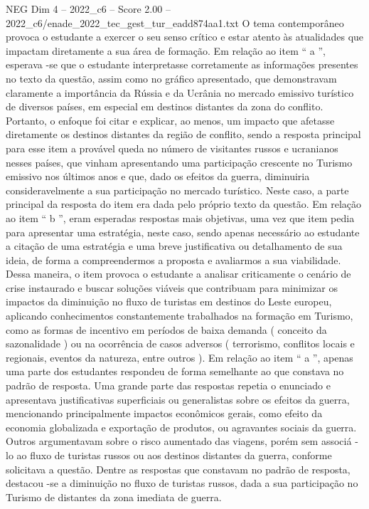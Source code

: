 \begin{textsample}{NEG Dim 4 – 2022\_c6 – Score 2.00 – 2022\_c6/enade\_2022\_tec\_gest\_tur\_eadd874aa1.txt}
O tema contemporâneo provoca o estudante a exercer o seu senso crítico e estar atento às atualidades que impactam diretamente a sua área de formação.
Em relação ao item “ a ”, esperava -se que o estudante interpretasse corretamente as informações presentes no texto da questão, assim como no gráfico apresentado, que demonstravam claramente a importância da Rússia e da Ucrânia no mercado emissivo turístico de diversos países, em especial em destinos distantes da zona do conflito.
Portanto, o enfoque foi citar e explicar, ao menos, um impacto que afetasse diretamente os destinos distantes da região de conflito, sendo a resposta principal para esse item a provável queda no número de visitantes russos e ucranianos nesses países, que vinham apresentando uma participação crescente no Turismo emissivo nos últimos anos e que, dado os efeitos da guerra, diminuiria consideravelmente a sua participação no mercado turístico.
Neste caso, a parte principal da resposta do item era dada pelo próprio texto da questão.
Em relação ao item “ b ”, eram esperadas respostas mais objetivas, uma vez que item pedia para apresentar uma estratégia, neste caso, sendo apenas necessário ao estudante a citação de uma estratégia e uma breve justificativa ou detalhamento de sua ideia, de forma a compreendermos a proposta e avaliarmos a sua viabilidade.
Dessa maneira, o item provoca o estudante a analisar criticamente o cenário de crise instaurado e buscar soluções viáveis que contribuam para minimizar os impactos da diminuição no fluxo de turistas em destinos do Leste europeu, aplicando conhecimentos constantemente trabalhados na formação em Turismo, como as formas de incentivo em períodos de baixa demanda ( conceito da sazonalidade ) ou na ocorrência de casos adversos ( terrorismo, conflitos locais e regionais, eventos da natureza, entre outros ).
Em relação ao item “ a ”, apenas uma parte dos estudantes respondeu de forma semelhante ao que constava no padrão de resposta.
Uma grande parte das respostas repetia o enunciado e apresentava justificativas superficiais ou generalistas sobre os efeitos da guerra, mencionando principalmente impactos econômicos gerais, como efeito da economia globalizada e exportação de produtos, ou agravantes sociais da guerra.
Outros argumentavam sobre o risco aumentado das viagens, porém sem associá -lo ao fluxo de turistas russos ou aos destinos distantes da guerra, conforme solicitava a questão.
Dentre as respostas que constavam no padrão de resposta, destacou -se a diminuição no fluxo de turistas russos, dada a sua participação no Turismo de distantes da zona imediata de guerra.

\end{textsample}
